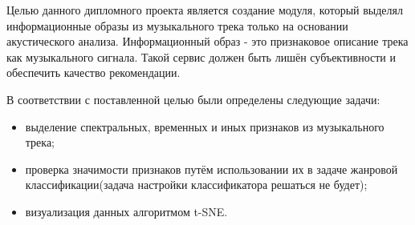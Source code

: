 Целью данного дипломного проекта является создание  модуля, который выделял информационные образы из музыкального трека только на основании  акустического анализа. Информационный образ - это признаковое описание трека как музыкального сигнала. Такой сервис должен быть лишён субъективности и обеспечить качество рекомендации.

В соответствии с поставленной целью были определены следующие задачи:

\begin{itemize}
\item выделение спектральных, временных и иных признаков из музыкального трека;
\item проверка значимости признаков путём использовании их в задаче жанровой классификации(задача настройки классификатора решаться не будет);
\item визуализация данных алгоритмом t-SNE.
\end{itemize}
